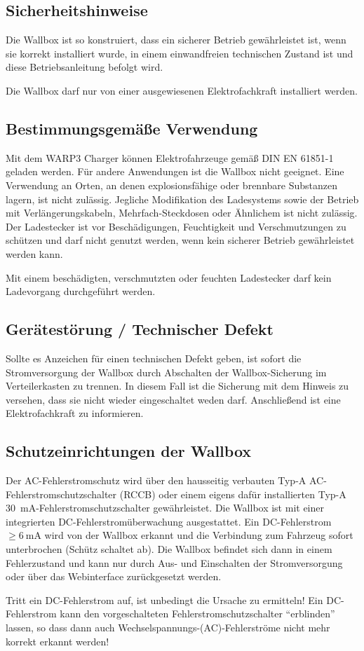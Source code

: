 \documentclass[a4paper,10pt]{article}
\newcommand{\hint}[1]{\begin{tcolorbox}[colback=boxgray,colframe=black,coltext=
white,title=Hinweis,left*=2mm,right*=2mm,boxsep=1mm,bottom=1mm,top=1mm]#1\end{tcolorbox}}
\begin{document}
\begin{multicols*}{2}

    \newpage
    \section{Sicherheitshinweise}
    Die Wallbox ist so konstruiert, dass ein sicherer Betrieb gewährleistet ist,
    wenn sie korrekt installiert wurde, in einem einwandfreien technischen Zustand
    ist und diese Betriebsanleitung befolgt wird. \hint{Die Wallbox darf nur von einer ausgewiesenen Elektrofachkraft installiert
        werden.}

    \subsection{Bestimmungsgemäße Verwendung}
    Mit dem WARP3 Charger können Elektrofahrzeuge gemäß DIN EN 61851-1 geladen
    werden. Für andere Anwendungen ist die Wallbox nicht geeignet. Eine Verwendung
    an Orten, an denen explosionsfähige oder brennbare Substanzen lagern, ist nicht
    zulässig. Jegliche Modifikation des Ladesystems sowie der Betrieb mit
    Verlängerungskabeln, Mehrfach-Steckdosen oder Ähnlichem ist nicht zulässig. Der
    Ladestecker ist vor Beschädigungen, Feuchtigkeit und Verschmutzungen zu
    schützen und darf nicht genutzt werden, wenn kein sicherer Betrieb
    gewährleistet werden kann. \hint{Mit einem beschädigten, verschmutzten oder feuchten Ladestecker darf kein Ladevorgang durchgeführt
        werden.}

    \subsection{Gerätestörung / Technischer Defekt}
    Sollte es Anzeichen für einen technischen Defekt geben, ist sofort die
    Stromversorgung der Wallbox durch Abschalten der Wallbox-Sicherung im Verteilerkasten zu trennen.
    In diesem Fall ist die Sicherung mit dem Hinweis zu versehen, dass sie nicht wieder eingeschaltet weden darf.
    Anschließend ist eine Elektrofachkraft zu informieren.

    \subsection{Schutzeinrichtungen der Wallbox}\label{dcerrorhint}
    Der AC-Fehlerstromschutz wird über den hausseitig verbauten
    Typ-A AC-Fehlerstromschutzschalter (RCCB) oder einem eigens dafür installierten
    Typ-A \SI{30}{\milli\ampere}-Fehlerstromschutzschalter gewährleistet. Die Wallbox ist
    mit einer integrierten DC-Fehlerstromüberwachung ausgestattet.
    Ein DC-Fehlerstrom $\geq \SI{6}{\milli\ampere}$ wird von der Wallbox erkannt und die Verbindung zum Fahrzeug sofort
    unterbrochen (Schütz schaltet ab). Die Wallbox befindet sich dann in einem
    Fehlerzustand und kann nur durch Aus- und Einschalten der
    Stromversorgung oder über das Webinterface zurückgesetzt werden.
    \hint{Tritt ein DC-Fehlerstrom auf, ist unbedingt die Ursache zu
    ermitteln! Ein DC-Fehlerstrom kann den vorgeschalteten Fehlerstromschutzschalter
    \enquote{erblinden} lassen, so dass dann auch Wechselspannungs-(AC)-Fehlerströme
    nicht mehr korrekt erkannt werden!}


\end{multicols*}
\end{document}
